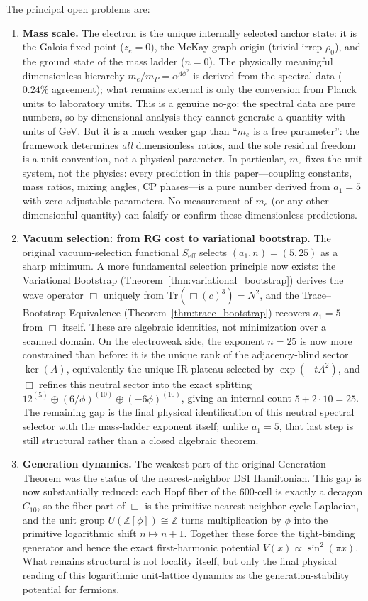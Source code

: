 \documentclass[12pt,a4paper]{article}
\theoremstyle{definition}
\begin{document}
The principal open problems are:
\begin{enumerate}
\item \textbf{Mass scale.}  The electron is the unique internally selected anchor state: it is the Galois fixed point ($z_e = 0$), the McKay graph origin (trivial irrep $\rho_0$), and the ground state of the mass ladder ($n = 0$).  The physically meaningful dimensionless hierarchy $m_e/m_P = \alpha^{4\phi^2}$ is derived from the spectral data ($0.24\%$ agreement); what remains external is only the conversion from Planck units to laboratory units.  This is a genuine no-go: the spectral data are pure numbers, so by dimensional analysis they cannot generate a quantity with units of GeV.  But it is a much weaker gap than ``$m_e$ is a free parameter'': the framework determines \emph{all} dimensionless ratios, and the sole residual freedom is a unit convention, not a physical parameter.  In particular, $m_e$ fixes the unit system, not the physics: every prediction in this paper---coupling constants, mass ratios, mixing angles, CP phases---is a pure number derived from $a_1 = 5$ with zero adjustable parameters.  No measurement of $m_e$ (or any other dimensionful quantity) can falsify or confirm these dimensionless predictions.
\item \textbf{Vacuum selection: from RG cost to variational bootstrap.}  The original vacuum-selection functional $S_{\mathrm{eff}}$ selects $(a_1,n) = (5,25)$ as a sharp minimum.  A more fundamental selection principle now exists: the Variational Bootstrap (Theorem~\ref{thm:variational_bootstrap}) derives the wave operator $\Box$ uniquely from $\mathrm{Tr}(\Box(c)^3) = N^2$, and the Trace--Bootstrap Equivalence (Theorem~\ref{thm:trace_bootstrap}) recovers $a_1 = 5$ from $\Box$ itself.  These are algebraic identities, not minimization over a scanned domain.  On the electroweak side, the exponent $n = 25$ is now more constrained than before: it is the unique rank of the adjacency-blind sector $\ker(A)$, equivalently the unique IR plateau selected by $\exp(-tA^2)$, and $\Box$ refines this neutral sector into the exact splitting $12^{(5)} \oplus (6/\phi)^{(10)} \oplus (-6\phi)^{(10)}$, giving an internal count $5 + 2\cdot10 = 25$.  The remaining gap is the final physical identification of this neutral spectral selector with the mass-ladder exponent itself; unlike $a_1 = 5$, that last step is still structural rather than a closed algebraic theorem.
\item \textbf{Generation dynamics.}  The weakest part of the original Generation Theorem was the status of the nearest-neighbor DSI Hamiltonian.  This gap is now substantially reduced: each Hopf fiber of the 600-cell is exactly a decagon $C_{10}$, so the fiber part of $\Box$ is the primitive nearest-neighbor cycle Laplacian, and the unit group $U(\mathbb{Z}[\phi]) \cong \mathbb{Z}$ turns multiplication by $\phi$ into the primitive logarithmic shift $n \mapsto n+1$.  Together these force the tight-binding generator and hence the exact first-harmonic potential $V(x) \propto \sin^2(\pi x)$.  What remains structural is not locality itself, but only the final physical reading of this logarithmic unit-lattice dynamics as the generation-stability potential for fermions.

\end{enumerate}
\end{document}
